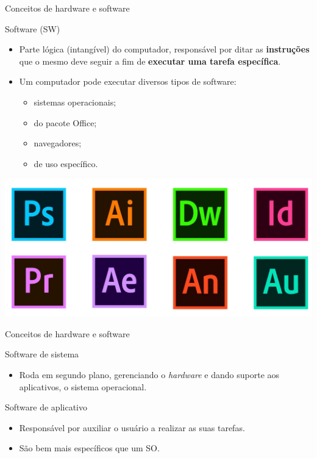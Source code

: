 \begin{frame}{Conceitos de hardware e software}
	\begin{block}{Software (SW)}
		\begin{itemize}
			\item Parte lógica (intangível) do computador, responsável por ditar as \textbf{instruções} que o mesmo deve seguir a fim de \textbf{executar uma tarefa específica}.
			\item Um computador pode executar diversos tipos de
			      software:
			      \begin{itemize}
				      \item\normalsize sistemas operacionais;
				      \item\normalsize do pacote Office;
				      \item\normalsize navegadores;
				      \item\normalsize de uso específico.
			      \end{itemize}

		\end{itemize}
	\end{block}

	\centering
	\includegraphics[width=0.6\linewidth]{Figuras/Ch01/fig22}
\end{frame}


\begin{frame}{Conceitos de hardware e software}
	\begin{block}{Software de sistema}
		\begin{itemize}
			\item Roda em segundo plano, gerenciando o \textit{hardware} e dando
			      suporte aos aplicativos, o sistema operacional.
		\end{itemize}
	\end{block}

	\begin{block}{Software de aplicativo}
		\begin{itemize}
			\item Responsável por auxiliar o usuário a realizar as suas tarefas.
			\item São bem mais específicos que um SO.
		\end{itemize}
	\end{block}

\end{frame}


